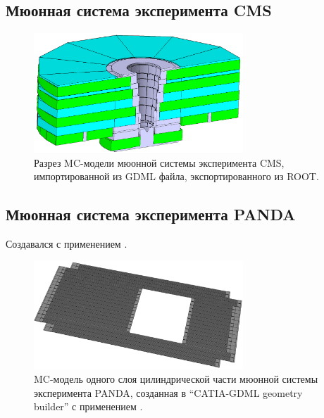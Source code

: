 \subsection{Мюонная система эксперимента CMS}\label{sec:secCmsMuon}


\begin{figure}[H]
\centering
\includegraphics[width=0.7\textwidth]{pictures/CMS_MUON.png}
\caption{Разрез MC-модели мюонной системы эксперимента CMS, импортированной из GDML файла, экспортированного из ROOT.}
\label{fig:CmsMuon}
\end{figure}


\subsection{Мюонная система эксперимента PANDA}\label{sec:secPandaMuon}


Создавался с применением .

\begin{figure}[H]
\centering
\includegraphics[width=0.7\textwidth]{pictures/PANDA_layer.png}
\caption{MC-модель одного слоя цилиндрической части мюонной системы эксперимента PANDA, созданная в ``CATIA-GDML geometry builder'' с применением .}
\label{fig:PandaMuonLayer}
\end{figure}

